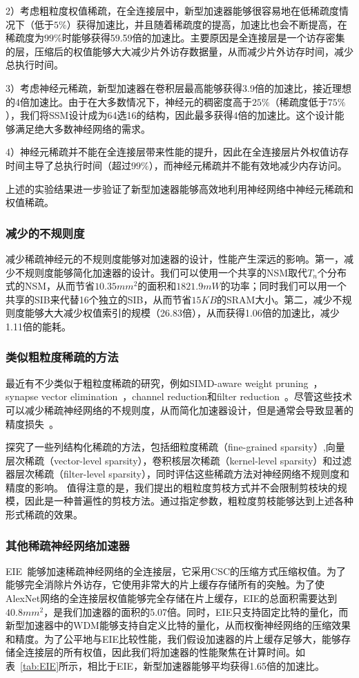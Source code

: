 2）考虑粗粒度权值稀疏，在全连接层中，新型加速器能够很容易地在低稀疏度情况下（低于$5\%$）获得加速比，并且随着稀疏度的提高，加速比也会不断提高，在稀疏度为$99\%$时能够获得59.59倍的加速比。主要原因是全连接层是一个访存密集的层，压缩后的权值能够大大减少片外访存数据量，从而减少片外访存时间，减少总执行时间。

3）考虑神经元稀疏，新型加速器在卷积层最高能够获得3.9倍的加速比，接近理想的4倍加速比。由于在大多数情况下，神经元的稠密度高于$25\%$（稀疏度低于$75\%$），我们将SSM设计成为64选16的结构，因此最多获得4倍的加速比。这个设计能够满足绝大多数神经网络的需求。

4）神经元稀疏并不能在全连接层带来性能的提升，因此在全连接层片外权值访存时间主导了总执行时间（超过$99\%$），而神经元稀疏并不能有效地减少内存访问。

上述的实验结果进一步验证了新型加速器能够高效地利用神经网络中神经元稀疏和权值稀疏。

\subsubsection{减少的不规则度}
减少稀疏神经元的不规则度能够对加速器的设计，性能产生深远的影响。第一，减少不规则度能够简化加速器的设计。我们可以使用一个共享的NSM取代$T_n$个分布式的NSM，从而节省$10.35mm^2$的面积和$1821.9mW$的功率；同时我们可以用一个共享的SIB来代替16个独立的SIB，从而节省$15KB$的SRAM大小。第二，减少不规则度能够大大减少权值索引的规模（26.83倍），从而获得1.06倍的加速比，减少1.11倍的能耗。

\subsubsection{类似粗粒度稀疏的方法}
最近有不少类似于粗粒度稀疏的研究，例如SIMD-aware weight pruning~\cite{yu2017scalpel}，synapse vector elimination~\cite{hill2017deftnn}，channel reduction和filter reduction~\cite{wen2016learning,lebedev2016fast}。尽管这些技术可以减少稀疏神经网络的不规则度，从而简化加速器设计，但是通常会导致显著的精度损失~\cite{li2016pruning}。

\citet{mao2017exploring}探究了一些列结构化稀疏的方法，包括细粒度稀疏（fine-grained sparsity）,向量层次稀疏（vector-level sparsity），卷积核层次稀疏（kernel-level sparsity）和过滤器层次稀疏（filter-level sparsity），同时评估这些稀疏方法对神经网络不规则度和精度的影响。 值得注意的是，我们提出的粗粒度剪枝方式并不会限制剪枝块的规模，因此是一种普遍性的剪枝方法。通过指定参数，粗粒度剪枝能够达到上述各种形式稀疏的效果。

\subsubsection{其他稀疏神经网络加速器}
EIE~\cite{han2016eie}能够加速稀疏神经网络的全连接层，它采用CSC的压缩方式压缩权值。为了能够完全消除片外访存，它使用非常大的片上缓存存储所有的突触。为了使AlexNet网络的全连接层权值能够完全存储在片上缓存，EIE的总面积需要达到$40.8mm^2$，是我们加速器的面积的5.07倍。同时，EIE只支持固定比特的量化，而新型加速器中的WDM能够支持自定义比特的量化，从而权衡神经网络的压缩效果和精度。为了公平地与EIE比较性能，我们假设加速器的片上缓存足够大，能够存储全连接层的所有权值，因此我们将加速器的性能聚焦在计算时间。如表~\ref{tab:EIE}所示，相比于EIE，新型加速器能够平均获得1.65倍的加速比。

